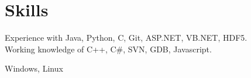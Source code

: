 \documentclass[11pt]{article}
\begin{document}
\section{Skills}
\begin{description}[style=nextline]
    \item[Technologies:]
            Experience with Java, Python, C, Git, ASP.NET, VB.NET, HDF5.\\
            Working knowledge of C++, C\#, SVN, GDB, Javascript.
    \item[Operating Systems:]
        {Windows, Linux}
\end{description}
\end{document}
